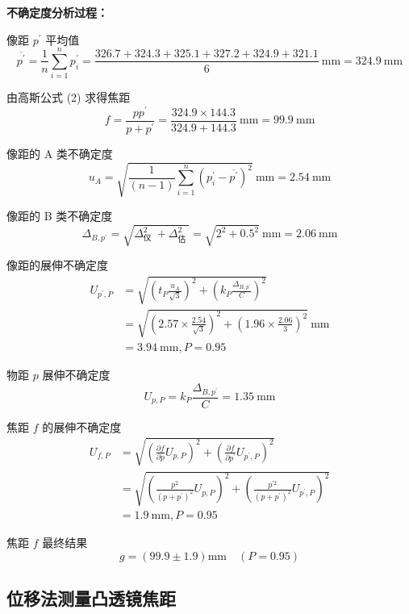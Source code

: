 \documentclass[10pt,a4paper]{article}	%
\begin{document}
	{\bf 不确定度分析过程：}

	像距 $p^{\prime}$ 平均值
	$$
	\overline{p^{\prime}}=\frac{1}{n} \sum_{i=1}^n p_i^\prime=\frac{326.7 + 324.3 + 325.1 + 327.2 + 324.9 + 321.1}{6} \mathrm{~mm}=324.9 \mathrm{~mm}
	$$

	由高斯公式 (2) 求得焦距
	$$
	f=\frac{p p^{\prime}}{p+p^{\prime}}=\frac{324.9 \times 144.3}{324.9+144.3} \mathrm{~mm}=99.9 \mathrm{~mm}
	$$

	像距的 A 类不确定度
	$$
	u_A=\sqrt{\frac{1}{(n-1) } \sum_{i=1}^n\left(p_i^{\prime}-\overline{p^{\prime}}\right)^2} \mathrm{~mm}=2.54\mathrm{~mm}
	$$

	像距的 B 类不确定度
	$$
	\Delta_{B, p^{\prime}}=\sqrt{\Delta_{\text {仪 }}^2+\Delta_{\text {估 }}^2}=\sqrt{2^2+0.5^2} \mathrm{~mm}=2.06 \mathrm{~mm}
	$$

	像距的展伸不确定度
	$$
	\begin{aligned}
	U_{p^{\prime}, P} & =\sqrt{\left(t_P \frac{u_A}{\sqrt 3}\right)^2+\left(k_P \frac{\Delta_{B, p^{\prime}}}{C}\right)^2} \\
	& =\sqrt{(2.57 \times \frac{2.54}{\sqrt 3})^2+\left(1.96 \times \frac{2.06}{3}\right)^2} \mathrm{~mm} \\
	& =3.94 \mathrm{~mm}, P=0.95
	\end{aligned}
	$$

	物距 $p$ 展伸不确定度
	$$
	U_{p, P}=k_P \frac{\Delta_{B, p^{\prime}}}{C}=1.35 \mathrm{~mm}
	$$

	焦距 $f$ 的展伸不确定度
	$$
	\begin{aligned}
	U_{f, P} & =\sqrt{\left(\frac{\partial f}{\partial p} U_{p, P}\right)^2+\left(\frac{\partial f}{\partial p^{\prime}} U_{p^{\prime}, P}\right)^2} \\
	& =\sqrt{\left(\frac{p^2}{\left(p+p^{\prime}\right)^2} U_{p, P}\right)^2+\left(\frac{p^{\prime 2}}{\left(p+p^{\prime}\right)^2} U_{p^{\prime}, P}\right)^2} \\
	& = 1.9 \mathrm{~mm}, P=0.95
	\end{aligned}
	$$

	焦距 $f$ 最终结果
	$$
	g=(99.9 \pm 1.9) \mathrm{mm} \quad(P=0.95)
	$$



	\subsection{位移法测量凸透镜焦距}
\end{document}
